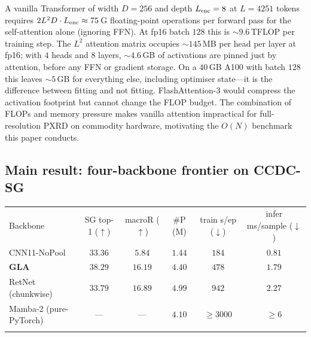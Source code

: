 \documentclass[final]{ws-ijwmip}
\begin{document}
A vanilla Transformer of width $D=256$ and depth $L_{\rm enc}=8$ at
$L=4251$ tokens requires
$2 L^2 D \cdot L_{\rm enc} \approx 75\,$G floating-point operations per
forward pass for the self-attention alone (ignoring FFN). At fp16 batch
$128$ this is $\sim 9.6\,$TFLOP per training step. The $L^2$ attention
matrix occupies $\sim 145\,$MB per head per layer at fp16; with $4$
heads and $8$ layers, $\sim 4.6\,$GB of activations are pinned just by
attention, before any FFN or gradient storage. On a $40\,$GB A100 with
batch $128$ this leaves $\sim 5\,$GB for everything else, including
optimiser state---it is the difference between fitting and not fitting.
FlashAttention-3 would compress the activation footprint but cannot
change the FLOP budget. The combination of FLOPs and memory pressure
makes vanilla attention impractical for full-resolution PXRD on
commodity hardware, motivating the $O(N)$ benchmark this paper conducts.


\subsection{Main result: four-backbone frontier on CCDC-SG}

\begin{table}[t]
{\begin{tabular}{lccccc}
\toprule
Backbone & SG top-1 ($\uparrow$) & macroR ($\uparrow$) & \#P (M) & train s/ep ($\downarrow$) & infer ms/sample ($\downarrow$) \\
\colrule
CNN11-NoPool       & $33.36$           & $5.84$           & $1.44$ & $184$       & $0.81$ \\
\textbf{GLA}       & $\mathbf{38.29}$  & $16.19$          & $4.40$ & $478$       & $1.79$ \\
RetNet (chunkwise) & $33.79$           & $\mathbf{16.89}$ & $4.99$ & $942$       & $2.27$ \\
Mamba-2 (pure-PyTorch) & ---           & ---              & $4.10$ & $\geq 3000$ & $\geq 6$ \\
\botrule
\end{tabular}}
\end{table}
\end{document}
